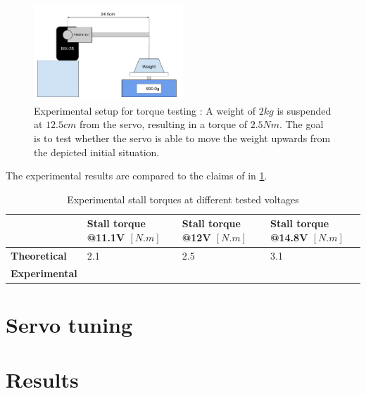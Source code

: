 \begin{figure}[htp]
\center
    \includegraphics[width = 0.5\textwidth]{figures/exp1}
    \caption[Experimental setup for torque testing]{Experimental setup for torque testing : A weight of $2kg$ is suspended at $12.5cm$ from the servo, resulting in a torque of $2.5Nm$. The goal is to test whether the servo is able to move the weight upwards from the depicted initial situation.}
    \label{fig:exp1}
\end{figure}

The experimental results are compared to the claims of \cite{mx_28_manual} in \cref{table:exp1_results}.
\begin{table}[htp]
\center
\begin{tabularx}{\textwidth}{@{}l X X X @{}}
\toprule
& \textbf{Stall torque @11.1V $[N.m]$} & \textbf{Stall torque @12V $[N.m]$} & \textbf{Stall torque @14.8V $[N.m]$}\\ 
\midrule
\textbf{Theoretical} & 2.1 & 2.5 & 3.1\\ 
\textbf{Experimental} &  &  & \\ 
\bottomrule
\end{tabularx}
\caption{Experimental stall torques at different tested voltages}
\label{table:exp1_results}
\end{table}

\section{Servo tuning}

\section{Results}